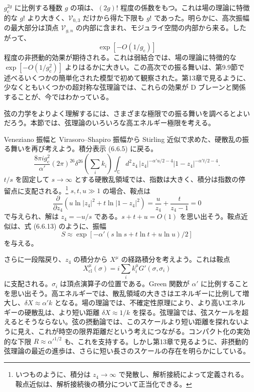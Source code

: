 $g_{\mathrm c}^{2g}$ に比例する種数 $g$ の項は、$(2g)!$ 程度の係数をもつ。これは場の理論に特徴的な $g!$ より大きく、$\mathcal V_{0,3}$ だけから得た下限も $g!$ であった。明らかに、高次振幅の最大部分は頂点 $\mathcal V_{g,n}$ の内部に含まれ、モジュライ空間の内部から来る。したがって、
\begin{equation}
\exp[-O(1/g_{\mathrm c})]
\tag{9.7.9}\label{eq:9.7.9}
\end{equation}
程度の非摂動的効果が期待される。これは弱結合では、場の理論に特徴的な $\exp[-O(1/g_{\mathrm c}^2)]$ よりはるかに大きい。この高次での振る舞いは、第9.9節で述べるいくつかの簡単化された模型で初めて観察された。第13章で見るように、少なくともいくつかの超対称な弦理論では、これらの効果が D ブレーンと関係することが、今ではわかっている。

\label{sec:9.8}

弦の力学をよりよく理解するには、さまざまな極限での振る舞いを調べるとよいだろう。本節では、弦理論のいろいろな高エネルギー極限を考える。


Veneziano 振幅と Virasoro--Shapiro 振幅から Stirling 近似で求めた、硬散乱の振る舞いを再び考えよう。積分表示 (6.6.5) に戻る。
\begin{equation}
\frac{8\pi i g_{\mathrm c}^2}{\alpha'}
(2\pi)^{26}\delta^{26}\left(\sum_i k_i\right)
\int_{\mathbb C}d^2z_4\,
|z_4|^{-\alpha'u/2-4}|1-z_4|^{-\alpha't/2-4}.
\tag{9.8.1}\label{eq:9.8.1}
\end{equation}
$t/s$ を固定して $s\to\infty$ とする硬散乱領域では、指数は大きく、積分は指数の停留点に支配される。\footnote[4]{いつものように、積分は $z_4\to\infty$ で発散し、解析接続によって定義される。鞍点近似は、解析接続後の積分について正当化できる。}
$s,t,u\gg1$ の場合、鞍点は
\begin{equation}
\frac{\partial}{\partial z_4}
\left(u\ln|z_4|^2+t\ln|1-z_4|^2\right)
=\frac{u}{z_4}+\frac{t}{z_4-1}=0
\tag{9.8.2}\label{eq:9.8.2}
\end{equation}
で与えられ、解は $z_4=-u/s$ である。$s+t+u=O(1)$ を思い出そう。鞍点近似は、式 (6.6.13) のように、振幅
\begin{equation}
S\approx\exp[-\alpha'(s\ln s+t\ln t+u\ln u)/2]
\tag{9.8.3}\label{eq:9.8.3}
\end{equation}
を与える。

さらに一段階戻り、$z_4$ の積分から $X^\mu$ の経路積分を考えよう。これは鞍点
\begin{equation}
X_{\mathrm{cl}}^\mu(\sigma)
=i\sum_i k_i^\mu G'(\sigma,\sigma_i)
\tag{9.8.4}\label{eq:9.8.4}
\end{equation}
に支配される。$\sigma_i$ は頂点演算子の位置である。Green 関数が $\alpha'$ に比例することを思い出そう。高エネルギーでは、散乱領域の大きさはエネルギーに比例して増大し、$\delta X\approx\alpha'k$ となる。場の理論では、不確定性原理により、より高いエネルギーの硬散乱は、より短い距離 $\delta X\approx1/k$ を探る。弦理論では、弦スケールを超えるとそうならない。弦の摂動論では、このスケールより短い距離を探れないように見え、これが時空の限界距離だという考えにつながる。コンパクト化の実効的な下限 $R\approx\alpha'^{1/2}$ も、これを支持する。しかし第13章で見るように、非摂動的弦理論の最近の進歩は、さらに短い長さのスケールの存在を明らかにしている。

